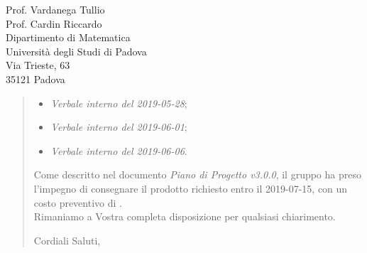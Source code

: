 \begin{letter}{
		Prof. Vardanega Tullio \\
		Prof. Cardin Riccardo \\
		Dipartimento di Matematica \\
		Università degli Studi di Padova \\
		Via Trieste, 63 \\
		35121 Padova}
\begin{quotation}
\begin{itemize}
	\item \textit{Verbale interno del 2019-05-28};
	
	\item \textit{Verbale interno del 2019-06-01};
	
	\item \textit{Verbale interno del 2019-06-06}.
\end{itemize}

\bigskip

\noindent Come descritto nel documento \textit{Piano di Progetto v3.0.0}, il gruppo ha preso l'impegno di consegnare il prodotto richiesto entro il 2019-07-15, con un costo preventivo di  \textbf{}.\\
Rimaniamo a Vostra completa disposizione per qualsiasi chiarimento.

\vspace{0.5cm}
\closing{ Cordiali Saluti,}
	

\end{quotation}
		
\end{letter}


